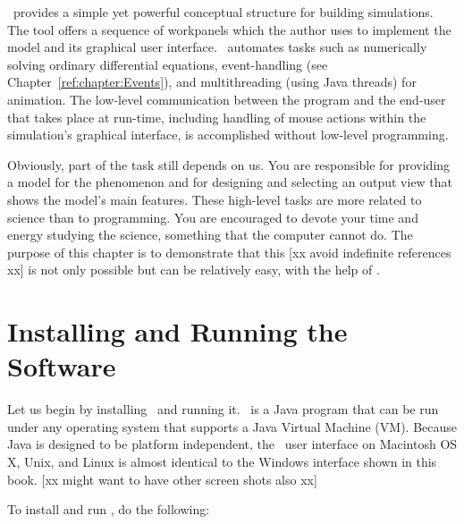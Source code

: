 \ejs\ provides a simple yet powerful conceptual structure for building simulations. The tool offers a 
sequence of workpanels which the author uses to implement the model and its graphical user interface. \ejs\ automates tasks such as numerically solving ordinary differential equations,  event-handling (see Chapter~\ref{ref:chapter:Events}), and multithreading (using Java threads) for animation. The low-level communication between the program and the end-user that takes place at run-time, including handling of mouse actions within the simulation's graphical interface, is accomplished without low-level programming.

Obviously, part of the task still depends on us. You are responsible for providing a model for the phenomenon and for
designing and selecting an output view that shows the model's main features. These high-level tasks are more related to
science than to programming. You are encouraged to devote your time and energy studying the science, something that the computer cannot do. The purpose of this chapter is to demonstrate that this [xx avoid indefinite references xx] is not
only possible but can be relatively easy, with the help of \Ejs.

    \section{Installing and Running the Software}\label{section:02Installation}

Let us begin by installing \Ejs\  and running it. \ejs\ is a Java program that can be run under any
operating system that supports a Java Virtual Machine (VM). Because Java is designed to be platform independent, the
\ejs\ user interface on Macintosh OS X, Unix, and Linux is almost identical to the Windows interface shown in this book. [xx might want to have other screen shots also xx]

To install and run \ejs, do the following:

